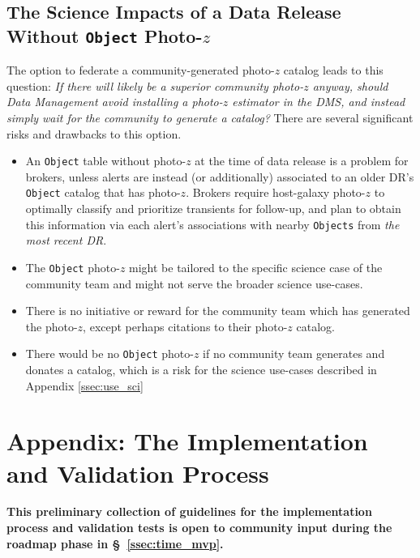 \documentclass[DM,lsstdraft,toc]{lsstdoc}
\begin{document}
\subsection{The Science Impacts of a Data Release Without {\tt Object} Photo-$z$}\label{ssec:opts_none}

The option to federate a community-generated photo-$z$ catalog leads to this question: {\it If there will likely be a superior community photo-$z$ anyway, should Data Management avoid installing a photo-$z$ estimator in the DMS, and instead simply wait for the community to generate a catalog?}
There are several significant risks and drawbacks to this option.
\vspace{-15pt}
\begin{itemize}
\item An {\tt Object} table without photo-$z$ at the time of data release is a problem for brokers, unless alerts are instead (or additionally) associated to an older DR's {\tt Object} catalog that has photo-$z$. Brokers require host-galaxy photo-$z$ to optimally classify and prioritize transients for follow-up, and plan to obtain this information via each alert's associations with nearby {\tt Objects} from {\it the most recent DR}.
\item The {\tt Object} photo-$z$ might be tailored to the specific science case of the community team and might not serve the broader science use-cases.
\item There is no initiative or reward for the community team which has generated the photo-$z$, except perhaps citations to their photo-$z$ catalog.
\item There would be no {\tt Object} photo-$z$ if no community team generates and donates a catalog, which is a risk for the science use-cases described in Appendix \ref{ssec:use_sci}
\end{itemize}


\clearpage
\section{Appendix: The Implementation and Validation Process}\label{sec:imp}

\textbf{This preliminary collection of guidelines for the implementation process and validation tests is open to community input during the roadmap phase in \S~\ref{ssec:time_mvp}.}
\end{document}

